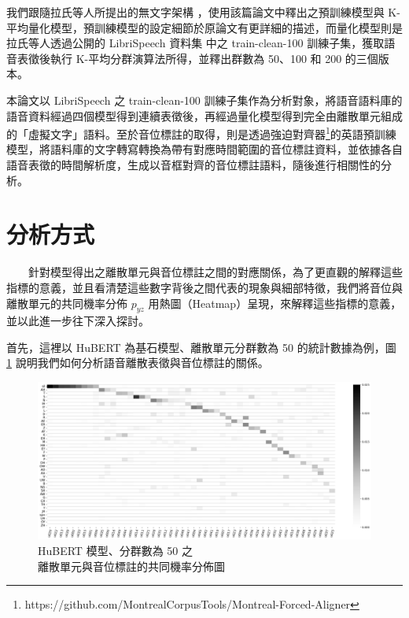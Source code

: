 {{        我們跟隨拉氏等人所提出的無文字架構 \cite{lakhotia_generative_2021-1} ，使用該篇論文中釋出之預訓練模型與 K-平均量化模型，預訓練模型的設定細節於原論文有更詳細的描述，而量化模型則是拉氏等人透過公開的 LibriSpeech 資料集 \cite{panayotov_librispeech_2015} 中之 train-clean-100 訓練子集，獲取語音表徵後執行 K-平均分群演算法所得，並釋出群數為 50、100 和 200 的三個版本。

        本論文以 LibriSpeech 之 train-clean-100 訓練子集作為分析對象，將語音語料庫的語音資料經過四個模型得到連續表徵後，再經過量化模型得到完全由離散單元組成的「虛擬文字」語料。至於音位標註的取得，則是透過強迫對齊器\footnote{https://github.com/MontrealCorpusTools/Montreal-Forced-Aligner}的英語預訓練模型，將語料庫的文字轉寫轉換為帶有對應時間範圍的音位標註資料，並依據各自語音表徵的時間解析度，生成以音框對齊的音位標註語料，隨後進行相關性的分析。

}

\section{分析方式}

　　針對模型得出之離散單元與音位標註之間的對應關係，為了更直觀的解釋這些指標的意義，並且看清楚這些數字背後之間代表的現象與細部特徵，我們將音位與離散單元的共同機率分佈 \(p_{yz}\) 用熱圖（Heatmap）呈現，來解釋這些指標的意義，並以此進一步往下深入探討。

        首先，這裡以 HuBERT 為基石模型、離散單元分群數為 50 的統計數據為例，圖 \ref{fig:hubert-50-joint-byprob} 說明我們如何分析語音離散表徵與音位標註的關係。

\begin{figure}
    \centering
    \includegraphics[width=1\linewidth]{figures/hubert-50-joint-byprob.png}
    \caption{HuBERT 模型、分群數為 50 之 \\
    離散單元與音位標註的共同機率分佈圖}
    \label{fig:hubert-50-joint-byprob}
\end{figure}

}
